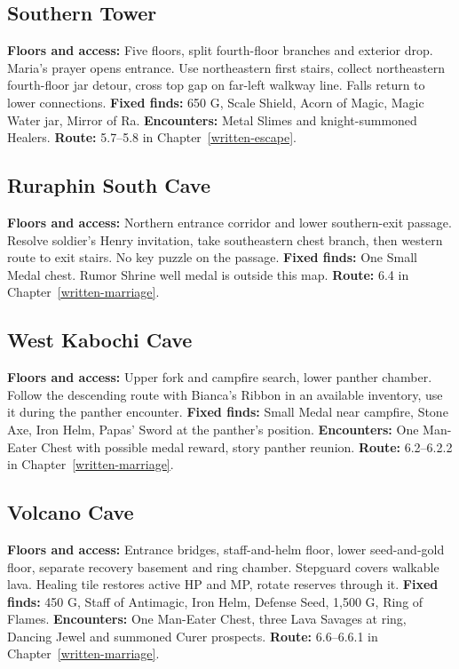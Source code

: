 \subsection{Southern Tower}
\label{atlas-southern}
\textbf{Floors and access:} Five floors, split fourth-floor branches and exterior drop. Maria's prayer opens entrance. Use northeastern first stairs, collect northeastern fourth-floor jar detour, cross top gap on far-left walkway line. Falls return to lower connections. \textbf{Fixed finds:} 650 G, Scale Shield, Acorn of Magic, Magic Water jar, Mirror of Ra. \textbf{Encounters:} Metal Slimes and knight-summoned Healers. \textbf{Route:} 5.7--5.8 in Chapter~\ref{written-escape}.

\subsection{Ruraphin South Cave}
\label{atlas-ruraphin}
\textbf{Floors and access:} Northern entrance corridor and lower southern-exit passage. Resolve soldier's Henry invitation, take southeastern chest branch, then western route to exit stairs. No key puzzle on the passage. \textbf{Fixed finds:} One Small Medal chest. Rumor Shrine well medal is outside this map. \textbf{Route:} 6.4 in Chapter~\ref{written-marriage}.

\subsection{West Kabochi Cave}
\label{atlas-kabochi}
\textbf{Floors and access:} Upper fork and campfire search, lower panther chamber. Follow the descending route with Bianca's Ribbon in an available inventory, use it during the panther encounter. \textbf{Fixed finds:} Small Medal near campfire, Stone Axe, Iron Helm, Papas' Sword at the panther's position. \textbf{Encounters:} One Man-Eater Chest with possible medal reward, story panther reunion. \textbf{Route:} 6.2--6.2.2 in Chapter~\ref{written-marriage}.

\subsection{Volcano Cave}
\label{atlas-volcano}
\textbf{Floors and access:} Entrance bridges, staff-and-helm floor, lower seed-and-gold floor, separate recovery basement and ring chamber. Stepguard covers walkable lava. Healing tile restores active HP and MP, rotate reserves through it. \textbf{Fixed finds:} 450 G, Staff of Antimagic, Iron Helm, Defense Seed, 1,500 G, Ring of Flames. \textbf{Encounters:} One Man-Eater Chest, three Lava Savages at ring, Dancing Jewel and summoned Curer prospects. \textbf{Route:} 6.6--6.6.1 in Chapter~\ref{written-marriage}.

